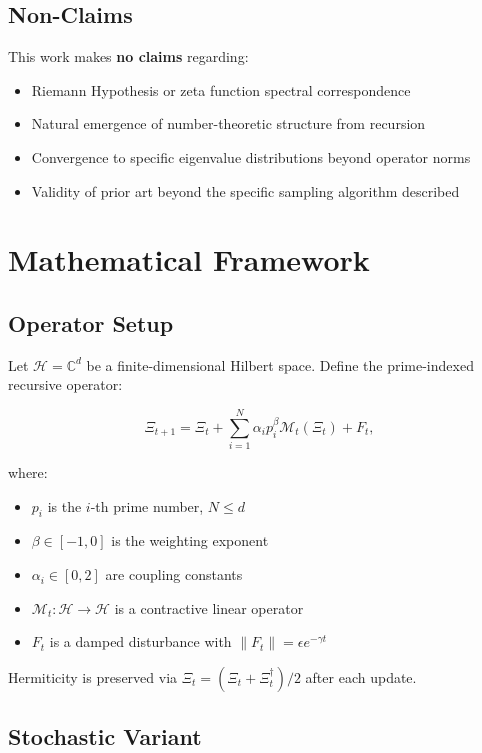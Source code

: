 \documentclass[11pt]{article}
\begin{document}
\subsection{Non-Claims}

This work makes \textbf{no claims} regarding:
\begin{itemize}
\item Riemann Hypothesis or zeta function spectral correspondence
\item Natural emergence of number-theoretic structure from recursion
\item Convergence to specific eigenvalue distributions beyond operator norms
\item Validity of prior art beyond the specific sampling algorithm described
\end{itemize}

\section{Mathematical Framework}

\subsection{Operator Setup}

Let $\mathcal{H} = \mathbb{C}^d$ be a finite-dimensional Hilbert space. Define the prime-indexed recursive operator:

\begin{equation}
\Xi_{t+1} = \Xi_t + \sum_{i=1}^N \alpha_i p_i^{\beta} \mathcal{M}_t(\Xi_t) + F_t,
\end{equation}

where:
\begin{itemize}
\item $p_i$ is the $i$-th prime number, $N \leq d$
\item $\beta \in [-1, 0]$ is the weighting exponent
\item $\alpha_i \in [0, 2]$ are coupling constants
\item $\mathcal{M}_t: \mathcal{H} \to \mathcal{H}$ is a contractive linear operator
\item $F_t$ is a damped disturbance with $\|F_t\| = \epsilon e^{-\gamma t}$
\end{itemize}

Hermiticity is preserved via $\Xi_t = (\Xi_t + \Xi_t^\dagger)/2$ after each update.

\subsection{Stochastic Variant}
\end{document}
